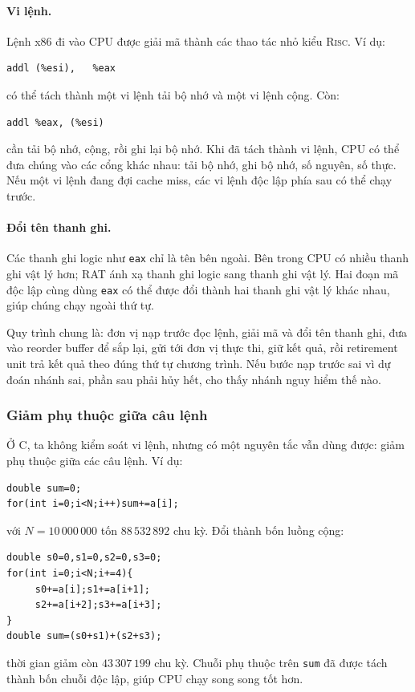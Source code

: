 \documentclass[11pt]{article}
\newcommand{\RISC}{\textsc{Risc}}
\begin{document}
\paragraph{Vi lệnh.}
Lệnh x86 đi vào CPU được giải mã thành các thao tác nhỏ kiểu \RISC. Ví dụ:
\begin{verbatim}
addl (%esi),   %eax
\end{verbatim}
có thể tách thành một vi lệnh tải bộ nhớ và một vi lệnh cộng. Còn:
\begin{verbatim}
addl %eax, (%esi)
\end{verbatim}
cần tải bộ nhớ, cộng, rồi ghi lại bộ nhớ. Khi đã tách thành vi lệnh, CPU có
thể đưa chúng vào các cổng khác nhau: tải bộ nhớ, ghi bộ nhớ, số nguyên, số
thực. Nếu một vi lệnh đang đợi cache miss, các vi lệnh độc lập phía sau có
thể chạy trước.

\paragraph{Đổi tên thanh ghi.}
Các thanh ghi logic như \texttt{eax} chỉ là tên bên ngoài. Bên trong CPU có
nhiều thanh ghi vật lý hơn; RAT ánh xạ thanh ghi logic sang thanh ghi vật lý.
Hai đoạn mã độc lập cùng dùng \texttt{eax} có thể được đổi thành hai thanh ghi
vật lý khác nhau, giúp chúng chạy ngoài thứ tự.

Quy trình chung là: đơn vị nạp trước đọc lệnh, giải mã và đổi tên thanh ghi,
đưa vào reorder buffer để sắp lại, gửi tới đơn vị thực thi, giữ kết quả, rồi
retirement unit trả kết quả theo đúng thứ tự chương trình. Nếu bước nạp trước
sai vì dự đoán nhánh sai, phần sau phải hủy hết, cho thấy nhánh nguy hiểm thế
nào.

\subsubsection{Giảm phụ thuộc giữa câu lệnh}

Ở C, ta không kiểm soát vi lệnh, nhưng có một nguyên tắc vẫn dùng được: giảm
phụ thuộc giữa các câu lệnh. Ví dụ:
\begin{verbatim}
double sum=0;
for(int i=0;i<N;i++)sum+=a[i];
\end{verbatim}
với \(N=10\,000\,000\) tốn \(88\,532\,892\) chu kỳ. Đổi thành bốn luồng cộng:
\begin{verbatim}
double s0=0,s1=0,s2=0,s3=0;
for(int i=0;i<N;i+=4){
     s0+=a[i];s1+=a[i+1];
     s2+=a[i+2];s3+=a[i+3];
}
double sum=(s0+s1)+(s2+s3);
\end{verbatim}
thời gian giảm còn \(43\,307\,199\) chu kỳ. Chuỗi phụ thuộc trên \texttt{sum}
đã được tách thành bốn chuỗi độc lập, giúp CPU chạy song song tốt hơn.
\end{document}
